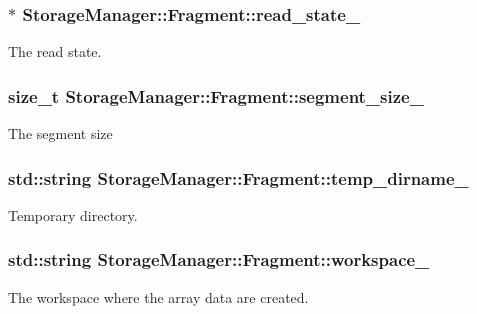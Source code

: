 \subsubsection[{read\+\_\+state\+\_\+}]{$\ast$ Storage\+Manager\+::\+Fragment\+::read\+\_\+state\+\_\+\hspace{0.3cm}{\ttfamily [private]}}\label{classStorageManager_1_1Fragment_a920650a1ba1e6923b387970d0b0919c9}
The read state. \hypertarget{classStorageManager_1_1Fragment_ac821268597048ee85e3b0f9a7ed134f2}{}
\subsubsection[{segment\+\_\+size\+\_\+}]{\setlength{\rightskip}{0pt plus 5cm}size\+\_\+t Storage\+Manager\+::\+Fragment\+::segment\+\_\+size\+\_\+\hspace{0.3cm}{\ttfamily [private]}}\label{classStorageManager_1_1Fragment_ac821268597048ee85e3b0f9a7ed134f2}
The segment size \hypertarget{classStorageManager_1_1Fragment_ac8440e27a50f5a2d05dcf227a92aa5ce}{}
\subsubsection[{temp\+\_\+dirname\+\_\+}]{\setlength{\rightskip}{0pt plus 5cm}std\+::string Storage\+Manager\+::\+Fragment\+::temp\+\_\+dirname\+\_\+\hspace{0.3cm}{\ttfamily [private]}}\label{classStorageManager_1_1Fragment_ac8440e27a50f5a2d05dcf227a92aa5ce}
Temporary directory. \hypertarget{classStorageManager_1_1Fragment_a2bba52e89247da9f220083a40625cc85}{}
\subsubsection[{workspace\+\_\+}]{\setlength{\rightskip}{0pt plus 5cm}std\+::string Storage\+Manager\+::\+Fragment\+::workspace\+\_\+\hspace{0.3cm}{\ttfamily [private]}}\label{classStorageManager_1_1Fragment_a2bba52e89247da9f220083a40625cc85}
The workspace where the array data are created. \hypertarget{classStorageManager_1_1Fragment_a575fde194ea2e0f1eaff4c939da801ff}{}
